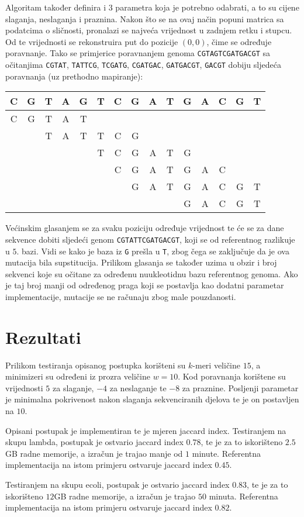 \documentclass[times, utf8, seminar, numeric]{fer}
\begin{document}
Algoritam također definira i $3$ parametra koja je potrebno odabrati, a to su cijene slaganja, neslaganja i praznina.
Nakon što se na ovaj način popuni matrica sa podatcima o sličnosti, pronalazi se najveća vrijednost u zadnjem retku i stupcu.
Od te vrijednosti se rekonstruira put do pozicije $(0,0)$, čime se određuje poravnanje.
Tako se primjerice poravnanjem genoma \texttt{CGTAGTCGATGACGT} sa očitanjima 
\texttt{CGTAT}, 
\texttt{TATTCG},
\texttt{TCGATG},
\texttt{CGATGAC},
\texttt{GATGACGT}, 
\texttt{GACGT}
dobiju sljedeća poravnanja (uz prethodno mapiranje):

\begin{tabular}{ccccccccccccccc }
    C&G&T&A&G&T&C&G&A&T&G&A&C&G&T\\ \hline
    C&G&T&A&T&&&&&&&&&&\\
     & &T&A&T&T&C&G& & & & & & &\\
     & & & & &T&C&G&A&T&G& & & &\\
     & & & & & &C&G&A&T&G&A&C& &\\
     & & & & & & &G&A&T&G&A&C&G&T\\
     & & & & & & & & & &G&A&C&G&T\\
\end{tabular}

Većinskim glasanjem se za svaku poziciju određuje vrijednost te će se za dane sekvence dobiti sljedeći genom 
\texttt{CGTATTCGATGACGT}, koji se od referentnog razlikuje u $5.$ bazi. 
Vidi se kako je baza iz \texttt{G} prešla u \texttt{T}, zbog čega se zaključuje da je ova mutacija bila supstitucija.
Prilikom glasanja se također uzima u obzir i broj sekvenci koje su očitane za određenu nuukleotidnu bazu referentnog genoma.
Ako je taj broj manji od određenog praga koji se postavlja kao dodatni parametar implementacije, mutacije se ne računaju zbog male pouzdanosti.

\chapter{Rezultati}
Prilikom testiranja opisanog postupka korišteni su $k$-meri veličine $15$, a minimizeri su određeni iz prozra veličine $w=10$.
Kod poravnanja korištene su vrijednosti $5$ za slaganje, $-4$ za neslaganje te $-8$ za praznine.
Posljenji parametar je minimalna pokrivenost nakon slaganja sekvenciranih djelova te je on postavljen na $10$.

Opisani postupak je implementiran te je mjeren jaccard index.
Testiranjem na skupu lambda, postupak je ostvario jaccard index $0.78$,
te je za to iskorišteno $2.5$GB radne memorije, a izračun je trajao manje od $1$ minute.
Referentna implementacija na istom primjeru ostvaruje jaccard index $0.45$. 

Testiranjem na skupu ecoli, postupak je ostvario jaccard index $0.83$,
te je za to iskorišteno $12$GB radne memorije, a izračun je trajao $50$ minuta.
Referentna implementacija na istom primjeru ostvaruje jaccard index $0.82$.



\end{document}
